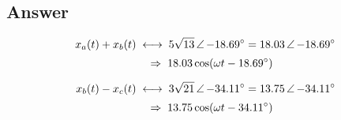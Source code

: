 \subsection*{Answer}

\begin{answerbox}
\begin{align*}
  x_a(t) + x_b(t) &\;\longleftrightarrow\; 5\sqrt{13}\,\angle\,\mathord{-18.69^\circ}
    = 18.03\,\angle\,\mathord{-18.69^\circ} \\[2pt]
  &\quad\Rightarrow\; 18.03\cos(\omega t - 18.69^\circ) \\[6pt]
  x_b(t) - x_c(t) &\;\longleftrightarrow\; 3\sqrt{21}\,\angle\,\mathord{-34.11^\circ}
    = 13.75\,\angle\,\mathord{-34.11^\circ} \\[2pt]
  &\quad\Rightarrow\; 13.75\cos(\omega t - 34.11^\circ)
\end{align*}
\end{answerbox}


